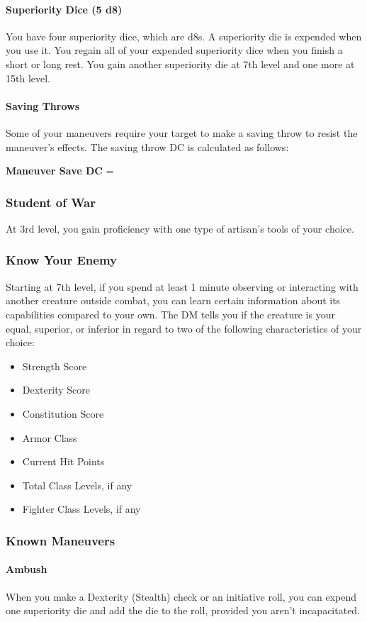 {\paragraph*{Superiority Dice (5 d8)} You have four superiority dice, which are d8s. A superiority die is expended when you use it. You regain all of your expended superiority dice when you finish a short or long rest. You gain another superiority die at 7th level and one more at 15th level.

\paragraph*{Saving Throws} Some of your maneuvers require your target to make a saving throw to resist the maneuver's effects. The saving throw DC is calculated as follows:

\textbf{Maneuver Save DC} = 
\subsubsection*{Student of War}
At 3rd level, you gain proficiency with one type of artisan's tools of your choice.
\subsubsection*{Know Your Enemy}
Starting at 7th level, if you spend at least 1 minute observing or interacting with another creature outside combat, you can learn certain information about its capabilities compared to your own. The DM tells you if the creature is your equal, superior, or inferior in regard to two of the following characteristics of your choice:
\begin{itemize}
	\item Strength Score
	\item Dexterity Score
	\item Constitution Score
	\item Armor Class
	\item Current Hit Points
	\item Total Class Levels, if any
	\item Fighter Class Levels, if any
\end{itemize}
\subsubsection*{Known Maneuvers}
\paragraph*{Ambush}
When you make a Dexterity (Stealth) check or an initiative roll, you can expend one superiority die and add the die to the roll, provided you aren't incapacitated.
}
